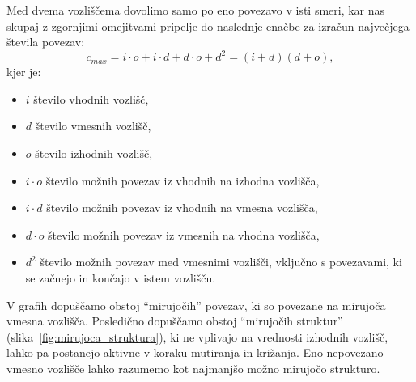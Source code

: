 \documentclass[a4paper,12pt,openright]{book}
\begin{document}
    Med dvema vozliščema dovolimo samo po eno povezavo v isti smeri, kar nas skupaj z zgornjimi omejitvami pripelje do naslednje
    enačbe za izračun največjega števila povezav:
    \begin{equation}
        c_{max} = i \cdot o + i \cdot d + d \cdot o + d^2 = (i + d)(d + o),
        \label{eq:edge_max}
    \end{equation}
    kjer je:
    \begin{itemize}
        \item $i$ število vhodnih vozlišč,
        \item $d$ število vmesnih vozlišč,
        \item $o$ število izhodnih vozlišč,
        \item $i \cdot o$ število možnih povezav iz vhodnih na izhodna vozlišča,
        \item $i \cdot d$ število možnih povezav iz vhodnih na vmesna vozlišča,
        \item $d \cdot o$ število možnih povezav iz vmesnih na vhodna vozlišča,
        \item $d^2$ število možnih povezav med vmesnimi vozlišči, vključno s povezavami, ki se začnejo in končajo v istem vozlišču.
    \end{itemize}

    V grafih dopuščamo obstoj \enquote{mirujočih} povezav, ki so povezane na mirujoča vmesna vozlišča.
    Posledično dopuščamo obstoj \enquote{mirujočih struktur} (slika~\ref{fig:mirujoca_struktura}), ki ne vplivajo na vrednosti izhodnih vozlišč,
    lahko pa postanejo aktivne v koraku mutiranja in križanja.
    Eno nepovezano vmesno vozlišče lahko razumemo kot najmanjšo možno mirujočo strukturo.
\end{document}
